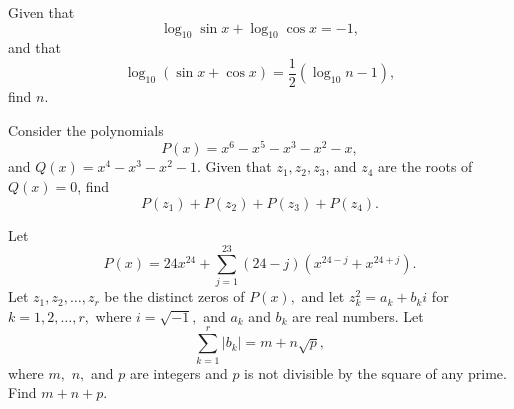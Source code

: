 \documentclass[11pt]{article}
\theoremstyle{definition}
\begin{document}
\begin{question}[name={2003 AIME I, \href{https://artofproblemsolving.com/community/c4p508862}{Problem 4}}]
	Given that $$\log_{10} \sin x + \log_{10} \cos x = -1,$$ and that $$\log_{10} (\sin x + \cos x) = \frac{1}{2} (\log_{10} n - 1),$$ find $n$.	
\end{question}


%	















\begin{question}[name={2003 AIME II, \href{https://artofproblemsolving.com/community/c4p713214}{Problem 9}}]
	Consider the polynomials $$P(x)=x^{6}-x^{5}-x^{3}-x^{2}-x,$$ and $Q(x)=x^{4}-x^{3}-x^{2}-1$. Given that $z_{1},z_{2},z_{3}$, and $z_{4}$ are the roots of $Q(x)=0$, find $$P(z_{1})+P(z_{2})+P(z_{3})+P(z_{4}).$$	
\end{question}


%	





















\begin{question}[name={2003 AIME II, \href{https://artofproblemsolving.com/community/c4p713223}{Problem 15}}]
	Let
	\[P(x)=24x^{24}+\sum_{j=1}^{23}(24-j)(x^{24-j}+x^{24+j}). \]Let $z_{1},z_{2},\ldots,z_{r}$ be the distinct zeros of $P(x),$ and let $z_{k}^{2}=a_{k}+b_{k}i$ for $k=1,2,\ldots,r,$ where $i=\sqrt{-1},$ and $a_{k}$ and $b_{k}$ are real numbers. Let
	\[\sum_{k=1}^{r}|b_{k}|=m+n\sqrt{p}, \]where $m,$ $n,$ and $p$ are integers and $p$ is not divisible by the square of any prime. Find $m+n+p$.
\end{question}


%	
\end{document}
